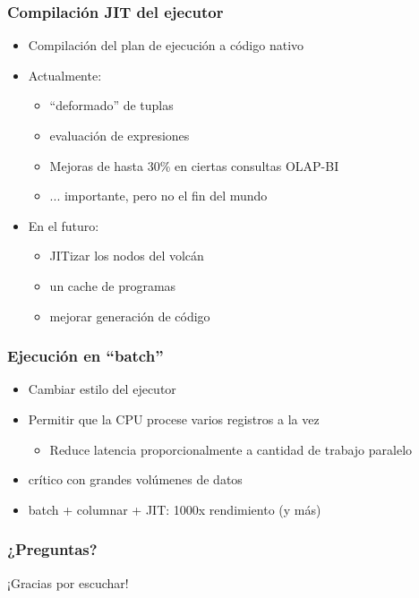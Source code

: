 \begin{frame}
\frametitle{Compilación JIT del ejecutor}

\begin{itemize}
\item Compilación del plan de ejecución a código nativo
\item Actualmente:
\begin{itemize}
\item ``deformado'' de tuplas
\item evaluación de expresiones
\item Mejoras de hasta 30\% en ciertas consultas OLAP-BI
\item ... importante, pero no el fin del mundo
\end{itemize}
\item En el futuro:
\begin{itemize}
\item JITizar los nodos del volcán
\item un cache de programas
\item mejorar generación de código
\end{itemize}
\end{itemize}

\end{frame}

\begin{frame}
\frametitle{Ejecución en ``batch''}

\begin{itemize}
\item Cambiar estilo del ejecutor
\item Permitir que la CPU procese varios registros a la vez
\begin{itemize}
\item  Reduce latencia proporcionalmente a cantidad de trabajo paralelo
\end{itemize}
\item crítico con grandes volúmenes de datos
\item batch + columnar + JIT: 1000x rendimiento (y más)
\end{itemize}

\end{frame}

\begin{frame}
\frametitle{¿Preguntas?}

\centering
¡Gracias por escuchar!
\end{frame}


